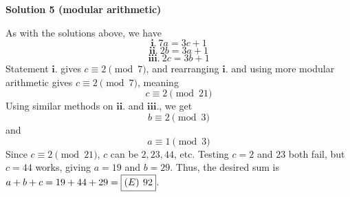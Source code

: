 \begin{enumerate}
\textbf{Solution 5 (modular arithmetic)}

As with the solutions above, we have 
 \[\textbf{i.} \ 7a=3c+1\] 
 \[\textbf{ii.} \ 2b=3a+1\] 
 \[\textbf{iii.} \ 2c=3b+1\] Statement $\textbf{i.}$ gives $c\equiv 2\pmod{7}$, and rearranging $\textbf{i.}$ and using more modular arithmetic gives $c \equiv 2 \pmod{7}$, meaning 
 \[c \equiv 2 \pmod{21}\] Using similar methods on $\textbf{ii.}$ and $\textbf{iii.}$, we get 
 \[b \equiv 2 \pmod{3}\] and 
 \[a \equiv 1 \pmod{3}\] Since $c \equiv 2 \pmod{21}$, $c$ can be $2, 23, 44$, etc. Testing $c= 2$ and $23$ both fail, but $c=44$ works, giving $a=19$ and $b=29$. Thus, the desired sum is $a+b+c= 19+44+29=\textbf{\boxed{(E)\ 92}}$.

 


\end{enumerate}